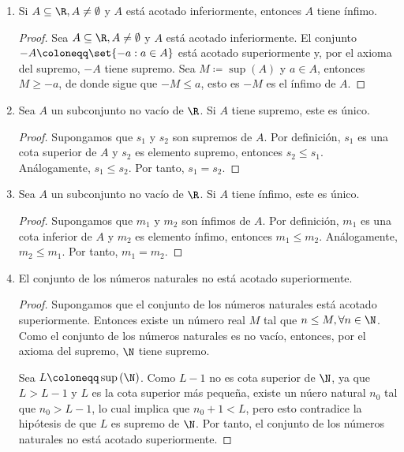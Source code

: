\begin{enumerate}[label=\alph*)]
  \item Si $A\subseteq \R, A\neq \emptyset$ y $A$ está acotado inferiormente, entonces $A$ tiene ínfimo.
  \begin{proof}\leavevmode
    Sea $A\subseteq \R, A\neq \emptyset$ y $A$ está acotado inferiormente. El conjunto $-A \coloneqq \set{-a: a\in A}$ está acotado superiormente y, por el axioma del supremo, $-A$ tiene supremo. Sea $M\coloneqq \sup{(A)}$ y $a\in A$, entonces $M\geq -a$, de donde sigue que $-M\leq a$, esto es $-M$ es el ínfimo de $A$.
  \end{proof}
  
  \item Sea $A$ un subconjunto no vacío de $\R$. Si $A$ tiene supremo, este es único.
 
  \begin{proof} 
   Supongamos que $s_1$ y $s_2$ son supremos de $A$. Por definición, $s_1$ es una cota superior de $A$ y $s_2$ es elemento supremo, entonces $s_2\leq s_1$. Análogamente, $s_1\leq s_2$. Por tanto, $s_1=s_2$.
  \end{proof}
 
  \item Sea $A$ un subconjunto no vacío de $\R$. Si $A$ tiene ínfimo, este es único.
  
  \begin{proof} 
   Supongamos que $m_1$ y $m_2$ son ínfimos de $A$. Por definición, $m_1$ es una cota inferior de $A$ y $m_2$ es elemento ínfimo, entonces $m_1\leq m_2$. Análogamente, $m_2\leq m_1$. Por tanto, $m_1=m_2$. 
  \end{proof}
  
  \item El conjunto de los números naturales no está acotado superiormente.
  \begin{proof}\leavevmode
    Supongamos que el conjunto de los números naturales está acotado superiormente. Entonces existe un número real $M$ tal que $n\leq M, \forall n\in \N$. Como el conjunto de los números naturales es no vacío, entonces, por el axioma del supremo, $\N$ tiene supremo.

    Sea $L\coloneqq \sup{(\N)}$. Como $L-1$ no es cota superior de $\N$, ya que $L>L-1$ y $L$ es la cota superior más pequeña, existe un núero natural $n_0$ tal que $n_0>L-1$, lo cual implica que $n_0+1<L$, pero esto contradice la hipótesis	de que $L$ es supremo de $\N$. Por tanto, el conjunto de los números naturales no está acotado superiormente.
  \end{proof}
  

\end{enumerate}
